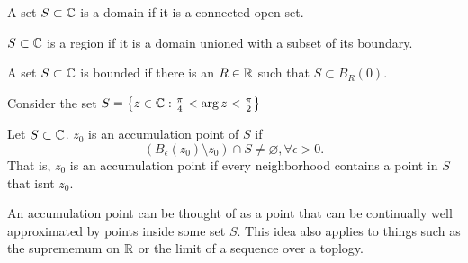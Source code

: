 \documentclass[../notes.tex]{subfiles}
\begin{document}
\begin{definition}[Domain]
    A set $S \subset \mathbb{C}$ is a domain if it is a connected open set.
\end{definition}

\begin{definition}[Region]
    $S \subset \mathbb{C}$ is a region if it is a domain unioned with a subset of its boundary.
\end{definition}

\begin{definition}[Boundedness]
    A set $S \subset \mathbb{C}$ is bounded if there is an $R \in \mathbb{R}$ such that $S \subset B_R(0)$.
\end{definition}

\begin{example}
    Consider the set $S = \qty{z \in \mathbb{C}: \frac{\pi}{4} < \arg z < \frac{\pi}{2}}$
\end{example}

\begin{definition}
    Let $S \subset \mathbb{C}$. $z_0$ is an accumulation point of $S$ if
    \[
        (B_\epsilon(z_0) \setminus z_0) \cap S \neq \varnothing, \forall \epsilon > 0
    .\]
    That is, $z_0$ is an accumulation point if every neighborhood contains a point in $S$ that isnt $z_0$.
\end{definition}

An accumulation point can be thought of as a point that can be continually well approximated by points inside some set $S$. This idea also applies to things such as the suprememum on $\mathbb{R}$ or the limit of a sequence over a toplogy.
\end{document}
